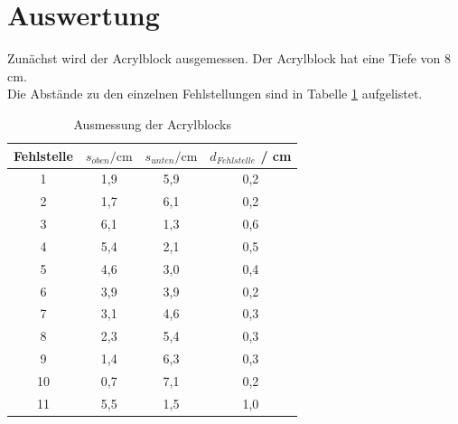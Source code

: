 

\section{Auswertung}
Zunächst wird der Acrylblock ausgemessen.
Der Acrylblock hat eine Tiefe von 8\,cm.\\
Die Abstände zu den einzelnen Fehlstellungen sind in Tabelle \ref{tab:ausmessung} aufgelistet.
\begin{table}[H]
  \centering
  \caption{Ausmessung der Acrylblocks}
  \label{tab:ausmessung}
  \begin{tabular}{c c c c}
    \toprule
    {Fehlstelle} & {$s_{oben} / \mathrm{cm}$} & {$s_{unten} / \mathrm{cm}$} & {$d_{Fehlstelle}$ / cm}\\
    \midrule
    1  & 1,9 & 5,9 & 0,2\\
    2  & 1,7 & 6,1 & 0,2\\
    3  & 6,1 & 1,3 & 0,6\\
    4  & 5,4 & 2,1 & 0,5\\
    5  & 4,6 & 3,0 & 0,4\\
    6  & 3,9 & 3,9 & 0,2\\
    7  & 3,1 & 4,6 & 0,3\\
    8  & 2,3 & 5,4 & 0,3\\
    9  & 1,4 & 6,3 & 0,3\\
    10 & 0,7 & 7,1 & 0,2\\
    11 & 5,5 & 1,5 & 1,0\\
    \bottomrule
  \end{tabular}
\end{table}


